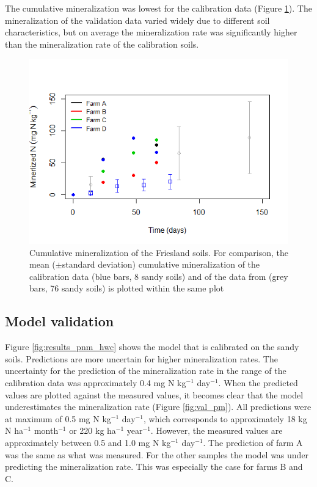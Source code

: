 \documentclass[10pt,twoside,dutch,english]{report}
\begin{document}
The cumulative mineralization was lowest for the calibration data (Figure \ref{fig:results_Ncum3}). The mineralization of the validation data varied widely due to different soil characteristics, but on average the mineralization rate was significantly higher than the mineralization rate of the calibration soils. 
\begin{figure}[h] %
		
		\centering
		\includegraphics[width=0.7\linewidth]{results_Ncum3}
		\caption{Cumulative mineralization of the Friesland soils. For comparison, the mean ($\pm$standard deviation) cumulative mineralization of the calibration data (blue bars, 8 sandy soils) and of the data from \citet{Ros2011} (grey bars, 76 sandy soils) is plotted within the same plot}
		\label{fig:results_Ncum3}
	\end{figure}

\subsection{Model validation}
Figure \ref{fig:results_pnm_hwc} shows the model that is calibrated on the sandy soils. Predictions are more uncertain for higher mineralization rates. The uncertainty for the  prediction of the mineralization rate in the range of the calibration data was approximately 0.4 mg N kg$^{-1}$ day$^{-1}$. When the predicted values are plotted against the measured values, it becomes clear that the model underestimates the mineralization rate (Figure \ref{fig:val_pm}). 
All predictions were at maximum of 0.5 mg N kg$^{-1}$ day$^{-1}$, which corresponds to approximately 18 kg N ha$^{-1}$ month$^{-1}$ or 220 kg ha$^{-1}$ year$^{-1}$.  However, the measured values are approximately between 0.5 and 1.0 mg N kg$^{-1}$ day$^{-1}$. The prediction of farm A was the same as what was measured. For the other samples the model was under predicting the mineralization rate. This was especially the case for farms B and C. 
\end{document}
